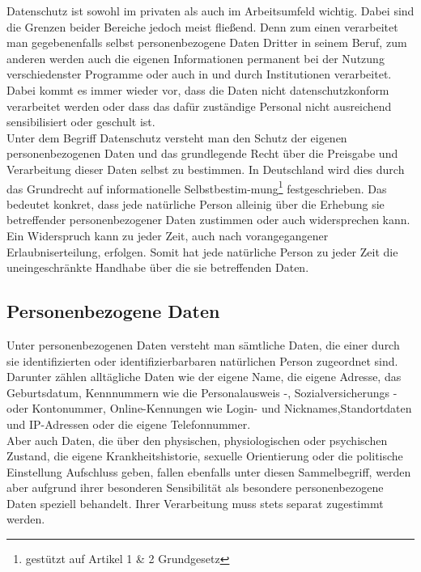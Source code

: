 Datenschutz ist sowohl im privaten als auch im Arbeitsumfeld wichtig. Dabei sind die Grenzen beider Bereiche jedoch meist fließend. Denn zum einen verarbeitet man gegebenenfalls selbst personenbezogene Daten Dritter in seinem Beruf, zum anderen werden auch die eigenen Informationen permanent bei der Nutzung verschiedenster Programme oder auch in und durch Institutionen verarbeitet. Dabei kommt es immer wieder vor, dass die Daten nicht datenschutzkonform verarbeitet werden oder dass das dafür zuständige Personal nicht ausreichend sensibilisiert oder geschult ist.\\

Unter dem Begriff Datenschutz versteht man den Schutz der eigenen personenbezogenen Daten und das grundlegende Recht über die Preisgabe und Verarbeitung dieser Daten selbst zu bestimmen. In Deutschland wird dies durch das Grundrecht auf informationelle Selbstbestim-mung\footnote{gestützt auf Artikel 1 \& 2 Grundgesetz} festgeschrieben. Das bedeutet konkret, dass jede natürliche Person alleinig über die Erhebung sie betreffender personenbezogener Daten zustimmen oder auch widersprechen kann. Ein Widerspruch kann zu jeder Zeit, auch nach vorangegangener Erlaubniserteilung, erfolgen. Somit hat jede natürliche Person zu jeder Zeit die uneingeschränkte Handhabe über die sie betreffenden Daten.

\subsection{Personenbezogene Daten}
    Unter personenbezogenen Daten versteht man sämtliche Daten, die einer durch sie identifizierten oder identifizierbarbaren natürlichen Person zugeordnet sind. Darunter zählen alltägliche Daten wie der eigene Name, die eigene Adresse, das Geburtsdatum, Kennnummern wie die Personalausweis -, Sozialversicherungs - oder Kontonummer, Online-Kennungen wie Login- und Nicknames,Standortdaten und IP-Adressen oder die eigene Telefonnummer.\\
    Aber auch Daten, die über den physischen, physiologischen oder psychischen Zustand, die eigene Krankheitshistorie, sexuelle Orientierung oder die politische Einstellung Aufschluss geben, fallen ebenfalls unter diesen Sammelbegriff, werden aber aufgrund ihrer besonderen Sensibilität als \glqq besondere personenbezogene Daten\grqq{} speziell behandelt. Ihrer Verarbeitung muss stets separat zugestimmt werden.


